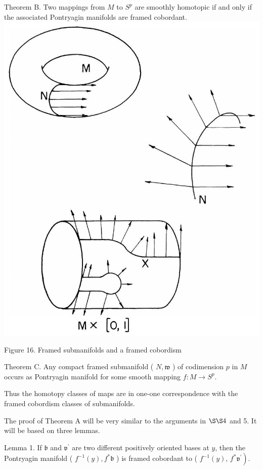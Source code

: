 \documentclass[10pt, letterpaper]{article}
\begin{document}
Theorem B. Two mappings from $M$ to $S^{p}$ are smoothly homotopic if and only if the associated Pontryagin manifolds are framed cobordant.\\
\includegraphics[scale=0.2, center]{2025_05_28_7c9927389b272ddbc2c3g-55}

Figure 16. Framed submanifolds and a framed cobordism

Theorem C. Any compact framed submanifold ( $N, \mathfrak{w}$ ) of codimension $p$ in $M$ occurs as Pontryagin manifold for some smooth mapping $f: M \rightarrow S^{p}$.

Thus the homotopy classes of maps are in one-one correspondence with the framed cobordism classes of submanifolds.

The proof of Theorem A will be very similar to the arguments in $\S \S 4$ and 5. It will be based on three lemmas.

Lemma 1. If $\mathfrak{b}$ and $\mathfrak{v}^{\prime}$ are two different positively oriented bases at $y$, then the Pontryagin manifold ( $f^{-1}(y), f^{*} \mathfrak{b}$ ) is framed cobordant to ( $f^{-1}(y)$, $\left.f^{*} \mathfrak{v}^{\prime}\right)$.
\end{document}

